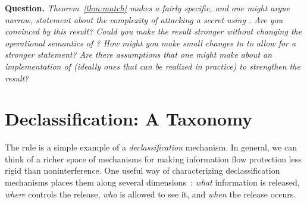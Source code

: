 \documentclass[11pt,twoside]{scrartcl}
\begin{document}
\textbf{Question.} \emph{Theorem~\ref{thm:match} makes a fairly specific, and one might argue narrow, statement about the complexity of attacking a secret using . Are you convinced by this result? Could you make the result stronger without changing the operational semantics of ? How might you make small changes to  to allow for a stronger statement? Are there assumptions that one might make about an implementation of  (ideally ones that can be realized in practice) to strengthen the result?}

\section{Declassification: A Taxonomy}

The  rule is a simple example of a \emph{declassification} mechanism. In general, we can think of a richer space of mechanisms for making information flow protection less rigid than noninterference. One useful way of characterizing declassification mechanisms places them along several dimensions~\cite{Sabelfeld09}: \emph{what} information is released, \emph{where} controls the release, \emph{who} is allowed to see it, and \emph{when} the release occurs.
\end{document}

